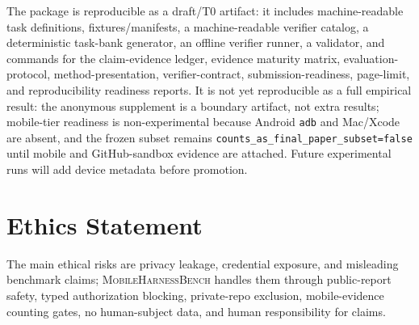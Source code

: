 \documentclass{article}
\newcommand{\mhb}{\textsc{MobileHarnessBench}}
\begin{document}
The package is reproducible as a draft/T0 artifact: it includes machine-readable task definitions, fixtures/manifests, a machine-readable verifier catalog, a deterministic task-bank generator, an offline verifier runner, a validator, and commands for the claim-evidence ledger, evidence maturity matrix, evaluation-protocol, method-presentation, verifier-contract, submission-readiness, page-limit, and reproducibility readiness reports.
It is not yet reproducible as a full empirical result: the anonymous supplement is a boundary artifact, not extra results; mobile-tier readiness is non-experimental because Android \texttt{adb} and Mac/Xcode are absent, and the frozen subset remains \texttt{counts\_as\_final\_paper\_subset=false} until mobile and GitHub-sandbox evidence are attached. Future experimental runs will add device metadata before promotion.

\section{Ethics Statement}

The main ethical risks are privacy leakage, credential exposure, and misleading benchmark claims; \mhb{} handles them through public-report safety, typed authorization blocking, private-repo exclusion, mobile-evidence counting gates, no human-subject data, and human responsibility for claims.



\end{document}
